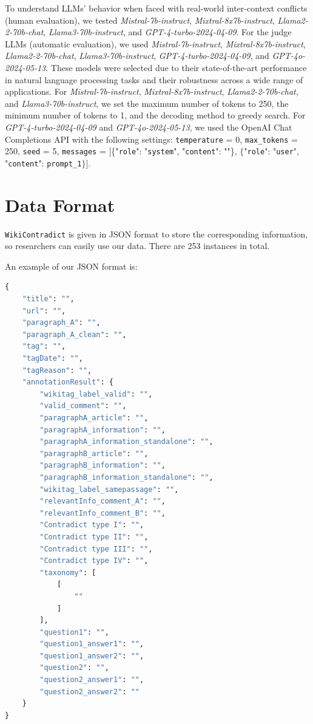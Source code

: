 \documentclass{article}
\begin{document}
To understand LLMs’ behavior when faced with real-world inter-context conflicts (human evaluation), we tested \textit{Mistral-7b-instruct}, \textit{Mixtral-8x7b-instruct}, \textit{Llama2-2-70b-chat}, \textit{Llama3-70b-instruct}, and \textit{GPT-4-turbo-2024-04-09}. For the judge LLMs (automatic evaluation), we used \textit{Mistral-7b-instruct}, \textit{Mixtral-8x7b-instruct}, \textit{Llama2-2-70b-chat}, \textit{Llama3-70b-instruct}, \textit{GPT-4-turbo-2024-04-09}, and \textit{GPT-4o-2024-05-13}. These models were selected due to their state-of-the-art performance in natural language processing tasks and their robustness across a wide range of applications. For \textit{Mistral-7b-instruct}, \textit{Mixtral-8x7b-instruct}, \textit{Llama2-2-70b-chat}, and \textit{Llama3-70b-instruct}, we set the maximum number of tokens to 250, the minimum number of tokens to 1, and the decoding method to greedy search. For \textit{GPT-4-turbo-2024-04-09} and \textit{GPT-4o-2024-05-13}, we used the OpenAI Chat Completions API with the following settings: \texttt{temperature} = 0, \texttt{max\_tokens} = 250, \texttt{seed} = 5, \texttt{messages} = [\{"\texttt{role}": "\texttt{system}", "\texttt{content}": ""\}, $\{$"\texttt{role}": "\texttt{user}", "\texttt{content}": \texttt{prompt\_1}$\}$].





\section{Data Format}

\label{appx:format}


\texttt{WikiContradict} is given in JSON format to store the corresponding information, so researchers can easily use our data. There are 253 instances in total.



An example of our JSON format is:
\begin{lstlisting}[language=python]      
{
    "title": "",
    "url": "",
    "paragraph_A": "",
    "paragraph_A_clean": "",
    "tag": "",
    "tagDate": "",
    "tagReason": "",
    "annotationResult": {
        "wikitag_label_valid": "",
        "valid_comment": "",
        "paragraphA_article": "",
        "paragraphA_information": "",
        "paragraphA_information_standalone": "",
        "paragraphB_article": "",
        "paragraphB_information": "",
        "paragraphB_information_standalone": "",
        "wikitag_label_samepassage": "",
        "relevantInfo_comment_A": "",
        "relevantInfo_comment_B": "",
        "Contradict type I": "",
        "Contradict type II": "",
        "Contradict type III": "",
        "Contradict type IV": "",
        "taxonomy": [
            [
                ""                    
            ]
        ],
        "question1": "",
        "question1_answer1": "",
        "question1_answer2": "",
        "question2": "",
        "question2_answer1": "",
        "question2_answer2": ""
    }
}
\end{lstlisting}
\end{document}
